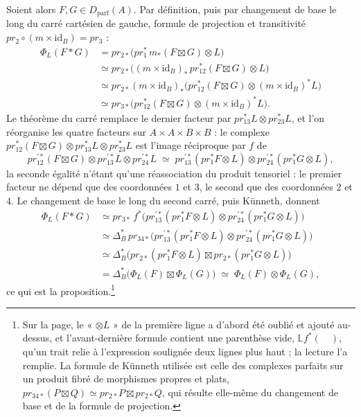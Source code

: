 \documentclass[11pt,a4paper]{article}
\begin{document}
Soient alors $F, G \in D_{\mathrm{parf}}(A)$. Par définition, puis par
changement de base le long du carré cartésien de gauche, formule de
projection et transitivité $pr_2 \circ (m \times \mathrm{id}_B) = pr_3$ :
\begin{align*}
  \Phi_L(F * G)
  &= pr_{2*}\bigl(pr_1^{*}\, m_{*}(F \boxtimes G) \otimes L\bigr) \\
  &\simeq pr_{2*}\bigl((m \times \mathrm{id}_B)_{*}\, pr_{12}^{*}(F \boxtimes G) \otimes L\bigr) \\
  &\simeq pr_{2*}(m \times \mathrm{id}_B)_{*}\bigl(pr_{12}^{*}(F \boxtimes G) \otimes (m \times \mathrm{id}_B)^{*}L\bigr) \\
  &\simeq pr_{3*}\bigl(pr_{12}^{*}(F \boxtimes G) \otimes (m \times \mathrm{id}_B)^{*}L\bigr).
\end{align*}
Le théorème du carré remplace le dernier facteur par
$pr_{13}^{*}L \otimes pr_{23}^{*}L$, et l'on réorganise les quatre facteurs
sur $A \times A \times B \times B$ : le complexe
$pr_{12}^{*}(F \boxtimes G) \otimes pr_{13}^{*}L \otimes pr_{23}^{*}L$ est
l'image réciproque par $f$ de
\[
  pr^{\prime *}_{12}(F \boxtimes G) \otimes pr^{\prime *}_{13}L \otimes pr^{\prime *}_{24}L
  \;\simeq\;
  pr^{\prime *}_{13}(pr_1^{*}F \otimes L) \otimes pr^{\prime *}_{24}(pr_1^{*}G \otimes L),
\]
la seconde égalité n'étant qu'une réassociation du produit tensoriel : le
premier facteur ne dépend que des coordonnées $1$ et $3$, le second que des
coordonnées $2$ et $4$. Le changement de base le long du second carré, puis
Künneth, donnent
\begin{align*}
  \Phi_L(F * G)
  &\simeq pr_{3*}\, f^{*}\bigl(pr^{\prime *}_{13}(pr_1^{*}F \otimes L) \otimes pr^{\prime *}_{24}(pr_1^{*}G \otimes L)\bigr) \\
  &\simeq \Delta_B^{*}\, pr_{34*}\bigl(pr^{\prime *}_{13}(pr_1^{*}F \otimes L) \otimes pr^{\prime *}_{24}(pr_1^{*}G \otimes L)\bigr) \\
  &\simeq \Delta_B^{*}\bigl(pr_{2*}(pr_1^{*}F \otimes L) \boxtimes pr_{2*}(pr_1^{*}G \otimes L)\bigr) \\
  &= \Delta_B^{*}\bigl(\Phi_L(F) \boxtimes \Phi_L(G)\bigr)
  \;\simeq\; \Phi_L(F) \otimes \Phi_L(G),
\end{align*}
ce qui est la proposition.\footnote{Sur la page, le « $\otimes L$ » de la
première ligne a d'abord été oublié et ajouté au-dessus, et l'avant-dernière
formule contient une parenthèse vide, $\mathbb{L}f^{*}(\quad)$, qu'un trait
relie à l'expression soulignée deux lignes plus haut ; la lecture l'a
remplie. La formule de Künneth utilisée est celle des complexes parfaits sur
un produit fibré de morphismes propres et plats, $pr_{34*}(P \boxtimes Q)
\simeq pr_{2*}P \boxtimes pr_{2*}Q$, qui résulte elle-même du changement de
base et de la formule de projection.}
\end{document}

